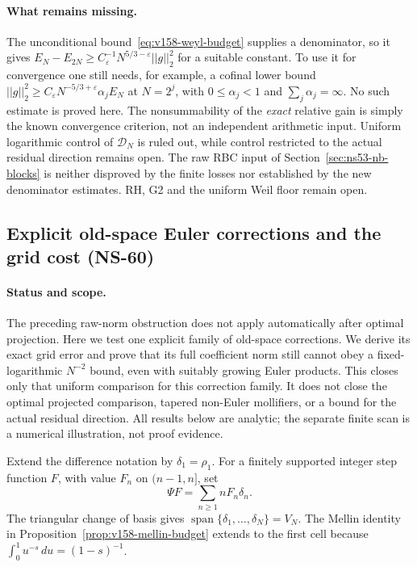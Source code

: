 \documentclass[11pt]{article}
\def\norm#1{||#1||}%
\theoremstyle{remark}
\newcommand{\norm}[1]{\left\lVert #1\right\rVert}
\begin{document}
\paragraph{What remains missing.}
The unconditional bound~\eqref{eq:v158-weyl-budget} supplies a denominator,
so it gives $E_N-E_{2N}\geq C_\varepsilon^{-1}
N^{5/3-\varepsilon}\norm{g}_2^2$ for a suitable constant.
To use it for convergence one still needs, for example, a cofinal lower
bound $\norm{g}_2^2\geq C_\varepsilon N^{-5/3+\varepsilon}
\alpha_j E_N$ at $N=2^j$, with $0\leq\alpha_j<1$ and
$\sum_j\alpha_j=\infty$. No such estimate is proved here.
The nonsummability of the \emph{exact} relative gain is simply the known
convergence criterion, not an independent arithmetic input.
Uniform logarithmic control of $\mathcal D_N$ is ruled out, while control
restricted to the actual residual direction remains open. The raw RBC
input of Section~\ref{sec:ns53-nb-blocks} is neither disproved by the
finite losses nor established by the new denominator estimates.
RH, G2 and the uniform Weil floor remain open.


\subsection{Explicit old-space Euler corrections and the grid cost (NS-60)}
\label{sec:ns60-euler-corrections}

\paragraph{Status and scope.}
The preceding raw-norm obstruction does not apply automatically after
optimal projection. Here we test one explicit family of old-space
corrections. We derive its exact grid error and prove that its full
coefficient norm still cannot obey a fixed-logarithmic $N^{-2}$ bound,
even with suitably growing Euler products. This closes only that uniform
comparison for this correction family. It does not close the optimal
projected comparison, tapered non-Euler mollifiers, or a bound for the
actual residual direction. All results below are analytic; the separate
finite scan is a numerical illustration, not proof evidence.

Extend the difference notation by $\delta_1=\rho_1$. For a finitely
supported integer step function $F$, with value $F_n$ on $(n-1,n]$, set
\begin{equation}
 \Psi F=\sum_{n\geq1}nF_n\delta_n.
 \label{eq:ns60-step-map}
\end{equation}
The triangular change of basis gives
$\operatorname{span}\{\delta_1,\ldots,\delta_N\}=V_N$.
The Mellin identity in Proposition~\ref{prop:v158-mellin-budget} extends
to the first cell because $\int_0^1u^{-s}\,du=(1-s)^{-1}$.
\end{document}
